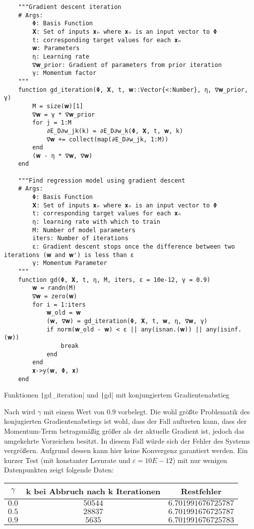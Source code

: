 \documentclass{article}
\theoremstyle{plain} %
\theoremstyle{definition} %
\begin{document}
\begin{listing}[!ht]
  \begin{verbatim} 
    """Gradient descent iteration
    # Args:
        Φ: Basis Function
        𝐗: Set of inputs 𝐱ₙ where 𝐱ₙ is an input vector to Φ
        t: corresponding target values for each 𝐱ₙ
        𝐰: Parameters
        η: Learning rate
        ∇𝐰_prior: Gradient of parameters from prior iteration
        γ: Momentum factor
    """
    function gd_iteration(Φ, 𝐗, t, 𝐰::Vector{<:Number}, η, ∇𝐰_prior, γ)
        M = size(𝐰)[1]
        ∇𝐰 = γ * ∇𝐰_prior
        for j = 1:M
            ∂E_D∂w_jk(k) = ∂E_D∂w_k(Φ, 𝐗, t, 𝐰, k)
            ∇𝐰 += collect(map(∂E_D∂w_jk, 1:M))
        end
        (𝐰 - η * ∇𝐰, ∇𝐰)
    end

    """Find regression model using gradient descent
    # Args:
        Φ: Basis Function
        𝐗: Set of inputs 𝐱ₙ where 𝐱ₙ is an input vector to Φ
        t: corresponding target values for each 𝐱ₙ
        η: learning rate with which to train
        M: Number of model parameters
        iters: Number of iterations
        ε: Gradient descent stops once the difference between two iterations (𝐰 and 𝐰') is less than ε
        γ: Momentum Parameter
    """
    function gd(Φ, 𝐗, t, η, M, iters, ε = 10e-12, γ = 0.9)
        𝐰 = randn(M)
        ∇𝐰 = zero(𝐰)
        for i = 1:iters
            𝐰_old = 𝐰
            (𝐰, ∇𝐰) = gd_iteration(Φ, 𝐗, t, 𝐰, η, ∇𝐰, γ)
            if norm(𝐰_old - 𝐰) < ε || any(isnan.(𝐰)) || any(isinf.(𝐰))
                break
            end
        end
        𝐱->y(𝐰, Φ, 𝐱)
    end
  \end{verbatim}
  \caption{Funktionen \texttt|gd_iteration| und \texttt|gd| mit konjungiertem Gradientenabstieg}
  \label{listing:simplebreak}
\end{listing}

Nach \cite[S. 110]{Lippe} wird $\gamma$ mit einem Wert von $0.9$ vorbelegt. Die wohl größte Problematik des konjugierten Gradientenabstiegs ist wohl, dass der Fall auftreten kann, dass der Momentum-Term betragsmäßig größer als der aktuelle Gradient ist, jedoch das umgekehrte Vorzeichen besitzt. In diesem Fall würde sich der Fehler des Systems vergrößern. Aufgrund dessen kann hier keine Konvergenz garantiert werden.
Ein kurzer Test (mit konstanter Lernrate und $\varepsilon=10E-12$) mit nur wenigen Datenpunkten zeigt folgende Daten:

\begin{tabular}{ccc}
  \toprule
  $\gamma$ & k bei Abbruch nach k Iterationen & Restfehler\\
  \midrule
  $0.0$ & $50544$ & $6.701991676725787$\\
  $0.5$ & $28837$ & $6.701991676725787$\\
  $0.9$ & $5635$ & $6.701991676725783$\\
\end{tabular}
\end{document}
